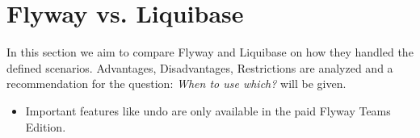 

\chapter{Flyway vs. Liquibase}
%
In this section we aim to compare Flyway and Liquibase on how they handled the defined scenarios.
Advantages, Disadvantages, Restrictions are analyzed and a recommendation for the question: \textit{When to use which?} will be given.

%

%
\begin{itemize}
	\item Important features like undo are only available in the paid Flyway Teams Edition.
\end{itemize}


\newpage